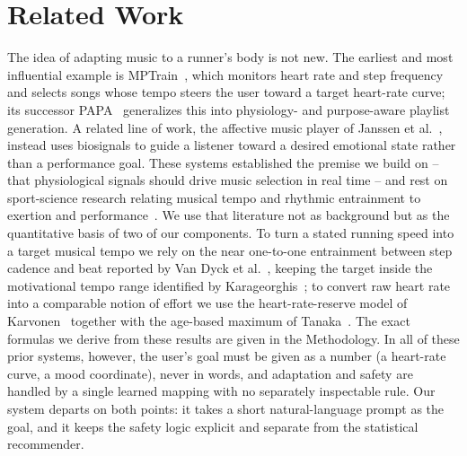 \documentclass[11pt,a4paper]{article}
\begin{document}
	\section{Related Work}

	The idea of adapting music to a runner's body is not new. The earliest and most influential example is MPTrain~\cite{oliver2006mptrain}, which monitors heart rate and step frequency and selects songs whose tempo steers the user toward a target heart-rate curve; its successor PAPA~\cite{oliver2006papa} generalizes this into physiology- and purpose-aware playlist generation. A related line of work, the affective music player of Janssen et al.~\cite{janssen2012amp}, instead uses biosignals to guide a listener toward a desired emotional state rather than a performance goal. These systems established the premise we build on -- that physiological signals should drive music selection in real time -- and rest on sport-science research relating musical tempo and rhythmic entrainment to exertion and performance~\cite{karageorghis2012music, vandyck2015entrainment}. We use that literature not as background but as the quantitative basis of two of our components. To turn a stated running speed into a target musical tempo we rely on the near one-to-one entrainment between step cadence and beat reported by Van Dyck et al.~\cite{vandyck2015entrainment}, keeping the target inside the motivational tempo range identified by Karageorghis~\cite{karageorghis2012music}; to convert raw heart rate into a comparable notion of effort we use the heart-rate-reserve model of Karvonen~\cite{karvonen1957} together with the age-based maximum of Tanaka~\cite{tanaka2001}. The exact formulas we derive from these results are given in the Methodology. In all of these prior systems, however, the user's goal must be given as a number (a heart-rate curve, a mood coordinate), never in words, and adaptation and safety are handled by a single learned mapping with no separately inspectable rule. Our system departs on both points: it takes a short natural-language prompt as the goal, and it keeps the safety logic explicit and separate from the statistical recommender.
\end{document}
